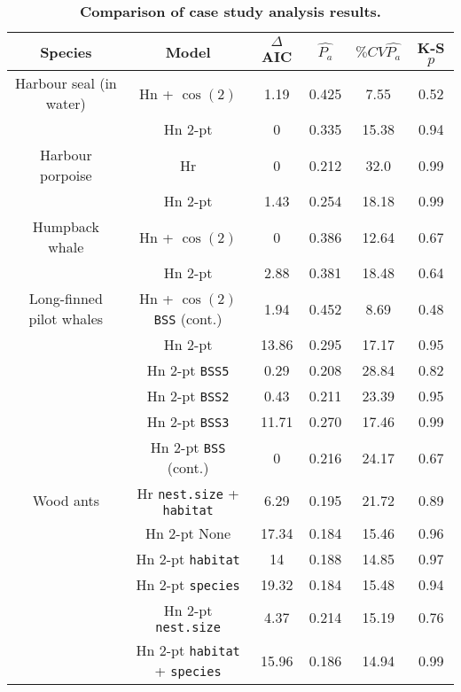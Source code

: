 \documentclass[10pt]{article}
\begin{document}
\begin{table}[!ht]
\caption{
{\bf Comparison of case study analysis results.}}
\centering
\begin{tabular}{| c | c | c | c | c | c |}
\hline
{\bf Species} & {\bf Model} & {\bf $\Delta$AIC} & $\hat{P_a}$ & {\bf $\% CV \hat{P_a}$} & {\bf K-S $p$}\\
\hline
Harbour seal (in water) & Hn + $\cos(2)$ & 1.19 & 0.425 & 7.55 & 0.52\\
\hline
 & Hn 2-pt  & 0 & 0.335 & 15.38 & 0.94\\
\hline
Harbour porpoise& Hr  & 0 & 0.212 & 32.0 & 0.99\\
\hline
 & Hn 2-pt & 1.43 & 0.254 & 18.18 & 0.99\\
\hline
Humpback whale & Hn + $\cos(2)$ & 0 & 0.386 & 12.64 & 0.67 \\
\hline
 & Hn 2-pt & 2.88 & 0.381 & 18.48 & 0.64 \\
\hline
Long-finned pilot whales  & Hn + $\cos(2)$ \texttt{BSS} (cont.) & 1.94 & 0.452 & 8.69 & 0.48\\ %
\hline
& Hn 2-pt          &  13.86  &  0.295  &  17.17  &  0.95 \\
\hline
 & Hn 2-pt \texttt{BSS5}         &  0.29   &  0.208  &  28.84  &  0.82 \\
 \hline
 & Hn 2-pt  \texttt{BSS2}        &  0.43  &  0.211  &  23.39  &  0.95 \\
 \hline
 & Hn 2-pt  \texttt{BSS3}        &  11.71 &  0.270  &  17.46  &  0.99 \\
 \hline
 & Hn 2-pt  \texttt{BSS} (cont.) & 0  &  0.216  &  24.17  &  0.67 \\
 \hline
Wood ants & Hr \texttt{nest.size} + \texttt{habitat} & 6.29 & 0.195  & 21.72 & 0.89\\ %
\hline
 & Hn 2-pt  None                                                     &  17.34 &  0.184  &  15.46  &  0.96 \\
 \hline
 & Hn 2-pt \texttt{habitat}                                          &  14     &  0.188  &  14.85  &  0.97 \\
 \hline
 & Hn 2-pt \texttt{species}                                          &  19.32  &  0.184  &  15.48  &  0.94 \\
 \hline
 & Hn 2-pt \texttt{nest.size}                                        &  4.37   &  0.214  &  15.19  &  0.76 \\
 \hline
 & Hn 2-pt \texttt{habitat} + \texttt{species}                       &  15.96  &  0.186  &  14.94  &  0.99 \\

\end{tabular}
\end{table}
\end{document}
